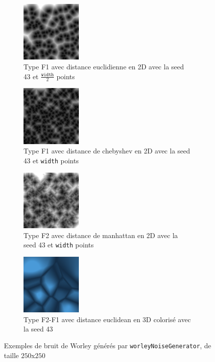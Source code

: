 \documentclass[11pt]{article}
\begin{document}
\begin{figure}[H]
    \centering
    \begin{subfigure}{0.2\textwidth}
    \centering
            \includegraphics[width=3cm]{WORLEY-F1-EUCLIDEAN-3DOFF-S43-NPWIDTH2.png}
        \caption{Type F1 avec distance euclidienne en 2D avec la seed 43 et $\frac{\texttt{width}}{2}$ points}
        \label{fig:worleyF1euclidean}
    \end{subfigure}
    \begin{subfigure}{0.2\textwidth}
    \centering
        \includegraphics[width=3cm]{WORLEY-F1-CHEBYSHEV-3DOFF-S43-NPWIDTH.png}
        \caption{Type F1 avec distance de chebyshev en 2D avec la seed 43 et \texttt{width} points}
        \label{fig:worleyF1chebyshev}
    \end{subfigure}
    \begin{subfigure}{0.2\textwidth}
    \centering
        \includegraphics[width=3cm]{WORLEY-F2-MANHATTAN-3DOFF-S43-NPWIDTH.png}
        \caption{Type F2 avec distance de manhattan en 2D avec la seed 43 et \texttt{width} points}
        \label{fig:worleyF2manhattan}
    \end{subfigure}
    \begin{subfigure}{0.2\textwidth}
    \centering
        \includegraphics[width=3cm]{WORLEY-F2F1-EUCLIDEAN-3DON-S43-CLRD.png}
        \caption{Type F2-F1 avec distance euclidean en 3D colorisé avec la seed 43}
        \label{fig:worleyF2F1euclidean}
    \end{subfigure}
    \caption{Exemples de bruit de Worley générés par \texttt{worleyNoiseGenerator}, de taille $250$x$250$}
    \label{fig:worley}
\end{figure}
\end{document}
